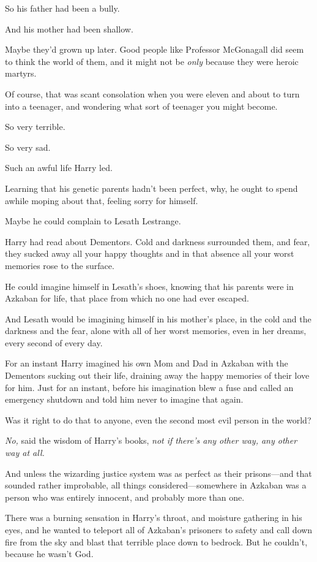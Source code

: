 So his father had been a bully.

And his mother had been shallow.

Maybe they'd grown up later. Good people like Professor McGonagall did seem to
think the world of them, and it might not be \emph{only} because they were
heroic martyrs.

Of course, that was scant consolation when you were eleven and about to turn
into a teenager, and wondering what sort of teenager you might become.

So very terrible.

So very sad.

Such an awful life Harry led.

Learning that his genetic parents hadn't been perfect, why, he ought to spend
awhile moping about that, feeling sorry for himself.

Maybe he could complain to Lesath Lestrange.

Harry had read about Dementors. Cold and darkness surrounded them, and fear,
they sucked away all your happy thoughts and in that absence all your worst
memories rose to the surface.

He could imagine himself in Lesath's shoes, knowing that his parents were in
Azkaban for life, that place from which no one had ever escaped.

And Lesath would be imagining himself in his mother's place, in the cold and
the darkness and the fear, alone with all of her worst memories, even in her
dreams, every second of every day.

For an instant Harry imagined his own Mom and Dad in Azkaban with the Dementors
sucking out their life, draining away the happy memories of their love for him.
Just for an instant, before his imagination blew a fuse and called an emergency
shutdown and told him never to imagine that again.

Was it right to do that to anyone, even the second most evil person in the
world?

\emph{No,} said the wisdom of Harry's books, \emph{not if there's any other
way, any other way at all.}

And unless the wizarding justice system was as perfect as their prisons---and
that sounded rather improbable, all things considered---somewhere in Azkaban
was a person who was entirely innocent, and probably more than one.

There was a burning sensation in Harry's throat, and moisture gathering in his
eyes, and he wanted to teleport all of Azkaban's prisoners to safety and call
down fire from the sky and blast that terrible place down to bedrock. But he
couldn't, because he wasn't God.

